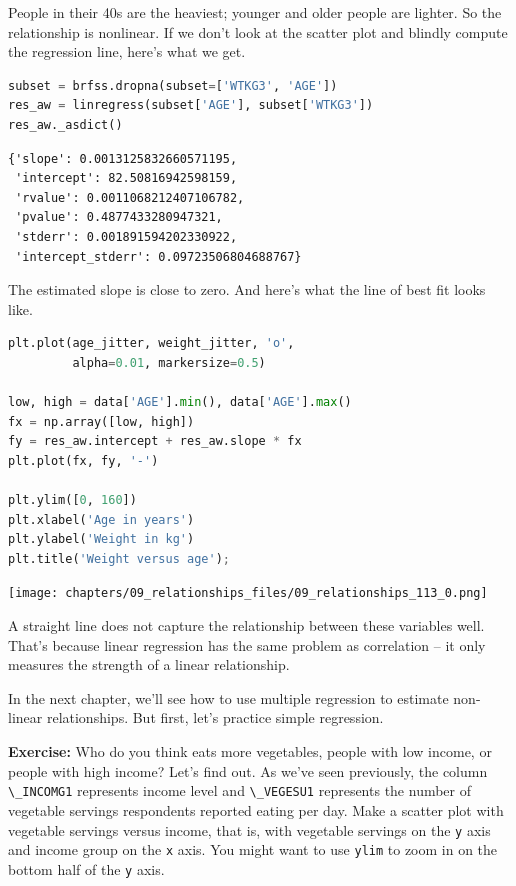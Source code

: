 People in their 40s are the heaviest; younger and older people are
lighter. So the relationship is nonlinear. If we don't look at the
scatter plot and blindly compute the regression line, here's what we
get.

\begin{lstlisting}[language=Python,style=source]
subset = brfss.dropna(subset=['WTKG3', 'AGE']) 
res_aw = linregress(subset['AGE'], subset['WTKG3'])
res_aw._asdict()
\end{lstlisting}

\begin{lstlisting}[style=output]
{'slope': 0.0013125832660571195,
 'intercept': 82.50816942598159,
 'rvalue': 0.0011068212407106782,
 'pvalue': 0.4877433280947321,
 'stderr': 0.001891594202330922,
 'intercept_stderr': 0.09723506804688767}
\end{lstlisting}

The estimated slope is close to zero. And here's what the line of best
fit looks like.

\begin{lstlisting}[language=Python,style=source]
plt.plot(age_jitter, weight_jitter, 'o', 
         alpha=0.01, markersize=0.5)

low, high = data['AGE'].min(), data['AGE'].max()
fx = np.array([low, high])
fy = res_aw.intercept + res_aw.slope * fx
plt.plot(fx, fy, '-')

plt.ylim([0, 160])
plt.xlabel('Age in years')
plt.ylabel('Weight in kg')
plt.title('Weight versus age');
\end{lstlisting}

\begin{center}
\texttt{[image: chapters/09\_relationships\_files/09\_relationships\_113\_0.png]}
\end{center}

A straight line does not capture the relationship between these
variables well. That's because linear regression has the same problem as
correlation -- it only measures the strength of a linear relationship.

In the next chapter, we'll see how to use multiple regression to
estimate non-linear relationships. But first, let's practice simple
regression.

\textbf{Exercise:} Who do you think eats more vegetables, people with
low income, or people with high income? Let's find out. As we've seen
previously, the column \passthrough{\lstinline!\_INCOMG1!} represents
income level and \passthrough{\lstinline!\_VEGESU1!} represents the
number of vegetable servings respondents reported eating per day. Make a
scatter plot with vegetable servings versus income, that is, with
vegetable servings on the \passthrough{\lstinline!y!} axis and income
group on the \passthrough{\lstinline!x!} axis. You might want to use
\passthrough{\lstinline!ylim!} to zoom in on the bottom half of the
\passthrough{\lstinline!y!} axis.

